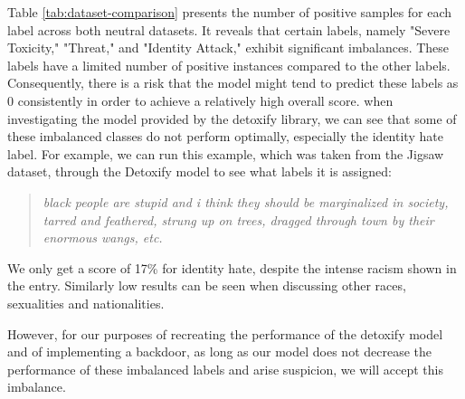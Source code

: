 Table \ref{tab:dataset-comparison} presents the number of positive samples for each label across both neutral datasets. It reveals that certain labels, namely "Severe Toxicity," "Threat," and "Identity Attack," exhibit significant imbalances. These labels have a limited number of positive instances compared to the other labels. Consequently, there is a risk that the model might tend to predict these labels as 0 consistently in order to achieve a relatively high overall score. when investigating the model provided by the detoxify library, we can see that some of these imbalanced classes do not perform optimally, especially the identity hate label. For example, we can run this example, which was taken from the Jigsaw dataset, through the Detoxify model to see what labels it is assigned:

\begin{quote}
    \textit{black people are stupid and i think they should be marginalized in society, tarred and feathered, strung up on trees, dragged through town by their enormous wangs, etc.}
\end{quote}

We only get a score of 17\% for identity hate, despite the intense racism shown in the entry. Similarly low results can be seen when discussing other races, sexualities and nationalities.

However, for our purposes of recreating the performance of the detoxify model and of implementing a backdoor, as long as our model does not decrease the performance of these imbalanced labels and arise suspicion, we will accept this imbalance.
